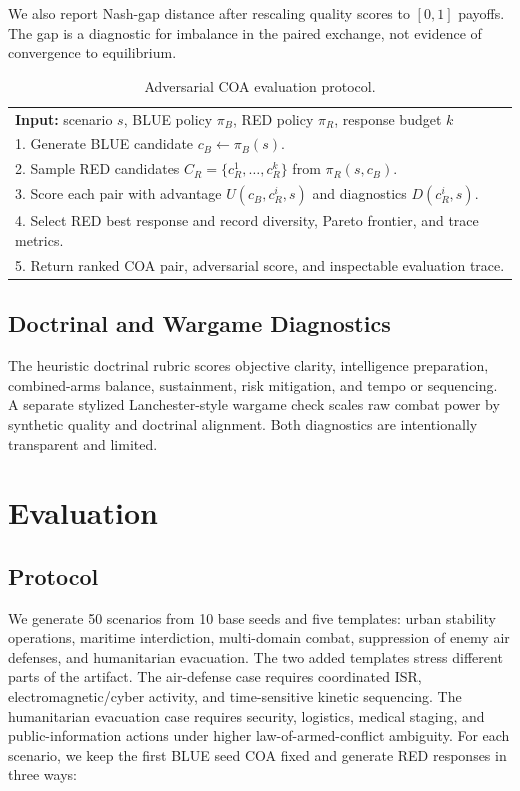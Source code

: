 \documentclass[sigconf]{acmart}
\begin{document}
We also report Nash-gap distance after rescaling quality scores to $[0,1]$ payoffs. The gap is a diagnostic for imbalance in the paired exchange, not evidence of convergence to equilibrium.

\begin{table}[t]
\caption{Adversarial COA evaluation protocol.}
\label{tab:algorithm}
\small
\begin{tabular}{@{}p{.96\linewidth}@{}}
\toprule
\textbf{Input:} scenario $s$, BLUE policy $\pi_B$, RED policy $\pi_R$, response budget $k$ \\
1. Generate BLUE candidate $c_B \leftarrow \pi_B(s)$. \\
2. Sample RED candidates $C_R=\{c_R^1,\ldots,c_R^k\}$ from $\pi_R(s,c_B)$. \\
3. Score each pair with advantage $U(c_B,c_R^i,s)$ and diagnostics $D(c_R^i,s)$. \\
4. Select RED best response and record diversity, Pareto frontier, and trace metrics. \\
5. Return ranked COA pair, adversarial score, and inspectable evaluation trace. \\
\bottomrule
\end{tabular}
\end{table}

\subsection{Doctrinal and Wargame Diagnostics}

The heuristic doctrinal rubric scores objective clarity, intelligence preparation, combined-arms balance, sustainment, risk mitigation, and tempo or sequencing. A separate stylized Lanchester-style wargame check scales raw combat power by synthetic quality and doctrinal alignment. Both diagnostics are intentionally transparent and limited.

\section{Evaluation}

\subsection{Protocol}

We generate 50 scenarios from 10 base seeds and five templates: urban stability operations, maritime interdiction, multi-domain combat, suppression of enemy air defenses, and humanitarian evacuation. The two added templates stress different parts of the artifact. The air-defense case requires coordinated ISR, electromagnetic/cyber activity, and time-sensitive kinetic sequencing. The humanitarian evacuation case requires security, logistics, medical staging, and public-information actions under higher law-of-armed-conflict ambiguity. For each scenario, we keep the first BLUE seed COA fixed and generate RED responses in three ways:
\end{document}
